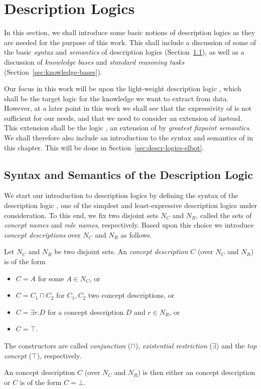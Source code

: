 \chapter{Description Logics}
\label{cha:description-logics}

In this section, we shall introduce some basic notions of description logics as they are
needed for the purpose of this work.  This shall include a discussion of some of the basic
\emph{syntax} and \emph{semantics} of description logics
(Section~\ref{sec:basic-noti-descr}), as well as a discussion of \emph{knowledge bases}
and \emph{standard reasoning tasks} (Section~\ref{sec:knowledge-bases}).

Our focus in this work will be upon the light-weight description logic \ELbot, which shall
be the target logic for the knowledge we want to extract from data.  However, at a later
point in this work we shall see that the expressivity of \ELbot is not sufficient for our
needs, and that we need to consider an extension of \ELbot instead.  This extension shall
be the logic \ELgfpbot, an extension of \ELbot by \emph{greatest fixpoint semantics}.  We
shall therefore also include an introduction to the syntax and semantics of \ELgfpbot in
this chapter.  This will be done in Section~\ref{sec:descr-logics-elbot}.

\section{Syntax and Semantics of the Description Logic \ELbot}
\label{sec:basic-noti-descr}

We start our introduction to description logics by defining the syntax of the description
logic \ELbot, one of the simplest and least-expressive description logics under
consideration.  To this end, we fix two disjoint sets $N_C$ and $N_R$, called the sets of
\emph{concept names} and \emph{role names}, respectively.  Based upon this choice we
introduce \emph{\ELbot concept descriptions} over $N_C$ and $N_R$ as follows.
\begin{Definition}
  \label{def:ELbot-concept-descriptions}
  Let $N_C$ and $N_R$ be two disjoint sets.  An \emph{\EL concept description} $C$ (over
  $N_C$ and $N_R$) is of the form
  \begin{itemize}
  \item $C = A$ for some $A \in N_C$, or
  \item $C = C_1 \sqcap C_2$ for $C_1, C_2$ two \EL concept descriptions, or
  \item $C = \exists r. D$ for a \EL concept description $D$ and $r \in N_R$, or
  \item $C = \top$.
  \end{itemize}
  The constructors are called \emph{conjunction} ($\sqcap$), \emph{existential
    restriction} ($\exists$) and the \emph{top concept} ($\top$), respectively.

  An \ELbot concept description $C$ (over $N_C$ and $N_R$) is then either an \EL concept
  description or $C$ is of the form $C = \bot$.
\end{Definition}


